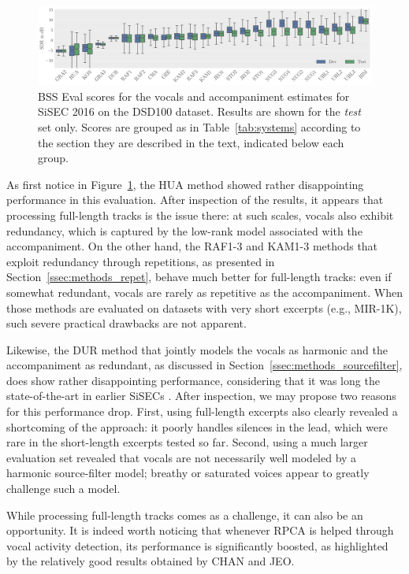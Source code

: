\begin{figure}[htbp]
	\includegraphics[width=\textwidth]{gfx/vocalsSDR.pdf}
	\caption{BSS Eval scores for the vocals and accompaniment estimates for SiSEC 2016 on the DSD100 dataset. Results are  shown for the \emph{test} set only. Scores are grouped as in Table~\ref{tab:systems} according to the section they are described in the text, indicated below each group.}
	\label{fig:eval}
\end{figure}

As first notice in Figure~\ref{fig:eval}, the HUA method showed rather disappointing performance in this evaluation. After inspection of the results, it appears that processing full-length tracks is the issue there: at such scales, vocals also exhibit redundancy, which is captured by the low-rank model associated with the accompaniment. On the other hand, the RAF1-3 and KAM1-3 methods that exploit redundancy through repetitions, as presented in Section~\ref{ssec:methods_repet}, behave much better for full-length tracks: even if somewhat redundant, vocals are rarely as repetitive as the accompaniment. When those methods are evaluated on datasets with very short excerpts (e.g., MIR-1K), such severe practical drawbacks are not apparent.

Likewise, the DUR method that jointly models the vocals as harmonic and the accompaniment as redundant, as discussed in Section~\ref{ssec:methods_sourcefilter}, does show rather disappointing performance, considering that it was long the state-of-the-art in earlier SiSECs \cite{vincent12}. After inspection, we may propose two reasons for this performance drop. First, using full-length excerpts also clearly revealed a shortcoming of the approach: it poorly handles silences in the lead, which were rare in the short-length excerpts tested so far. Second, using a much larger evaluation set revealed that vocals are not necessarily well modeled by a harmonic source-filter model; breathy or saturated voices appear to greatly challenge such a model.

While processing full-length tracks comes as a challenge, it can also be an opportunity. It is indeed worth noticing that whenever RPCA is helped through vocal activity detection, its performance is significantly boosted, as highlighted by the relatively good results obtained by CHAN and JEO.

